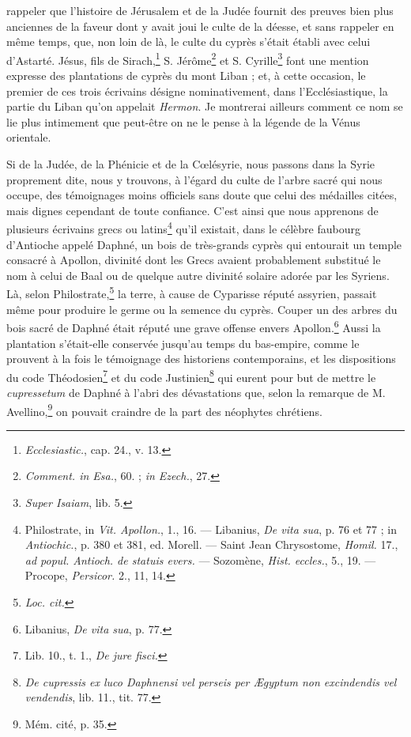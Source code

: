 \documentclass[a4paper, 11pt, oneside, polutonikogreek, french]{article}
\begin{document}
rappeler que l'histoire de Jérusalem et de la Judée fournit des preuves bien plus anciennes de la faveur dont y avait joui le culte de la déesse, et sans rappeler en même temps, que, non loin de là, le culte du cyprès s'était établi avec celui d'Astarté. Jésus, fils de Sirach,\footnote{\emph{Ecclesiastic.}, cap. 24., v. 13.} S. Jérôme\footnote{\emph{Comment. in Esa.}, 60. ; \emph{in Ezech.}, 27.} et S. Cyrille\footnote{\emph{Super Isaiam}, lib. 5.} font une mention expresse des plantations de cyprès du mont Liban ; et, à cette occasion, le premier de ces trois écrivains désigne nominativement, dans l'Ecclésiastique, la partie du Liban qu'on appelait \emph{Hermon}. Je montrerai ailleurs comment ce nom se lie plus intimement que peut-être on ne le pense à la légende de la Vénus orientale.

Si de la Judée, de la Phénicie et de la Cœlésyrie, nous passons dans la Syrie proprement dite, nous y trouvons, à l'égard du culte de l'arbre sacré qui nous occupe, des témoignages moins officiels sans doute que celui des médailles citées, mais dignes cependant de toute confiance. C'est ainsi que nous apprenons de plusieurs écrivains grecs ou latins\footnote{Philostrate, in \emph{Vit. Apollon.}, 1., 16. --- Libanius, \emph{De vita sua}, p. 76 et 77 ; in \emph{Antiochic.}, p. 380 et 381, ed. Morell. --- Saint Jean Chrysostome, \emph{Homil.} 17., \emph{ad popul. Antioch. de statuis evers.} --- Sozomène, \emph{Hist. eccles.}, 5., 19. --- Procope, \emph{Persicor.} 2., 11, 14.} qu'il existait, dans le célèbre faubourg d'Antioche appelé Daphné, un bois de très-grands cyprès qui entourait un temple consacré à Apollon, divinité dont les Grecs avaient probablement substitué le nom à celui de Baal ou de quelque autre divinité solaire adorée par les Syriens. Là, selon Philostrate,\footnote{\emph{Loc. cit.}} la terre, à cause de Cyparisse réputé assyrien, passait même pour produire le germe ou la semence du cyprès. Couper un des arbres du bois sacré de Daphné était réputé une grave offense envers Apollon.\footnote{Libanius, \emph{De vita sua}, p. 77.} Aussi la plantation s'était-elle conservée jusqu'au temps du bas-empire, comme le prouvent à la fois le témoignage des historiens contemporains, et les dispositions du code Théodosien\footnote{Lib. 10., t. 1., \emph{De jure fisci.}} et du code Justinien\footnote{\emph{De cupressis ex luco Daphnensi vel perseis per Ægyptum non excindendis vel vendendis}, lib. 11., tit. 77.} qui eurent pour but de mettre le \emph{cupressetum} de Daphné à l'abri des dévastations que, selon la remarque de M. Avellino,\footnote{Mém. cité, p. 35.} on pouvait craindre de la part des néophytes chrétiens.
\end{document}
